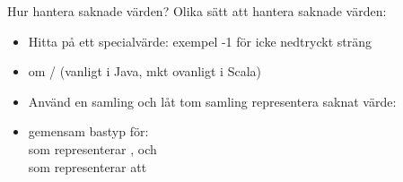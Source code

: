 



\begin{Slide}{Hur hantera saknade värden?}\SlideFontSmall
Olika sätt att hantera saknade värden:
\begin{itemize}
\item Hitta på ett specialvärde: exempel -1 för icke nedtryckt sträng
\item {} om / (vanligt i Java, mkt ovanligt i Scala) 
\item Använd en samling och låt tom samling representera saknat värde: \\

\item {} gemensam bastyp för: \\
   som representerar , och \\  som representerar att 
\end{itemize}
\end{Slide}

